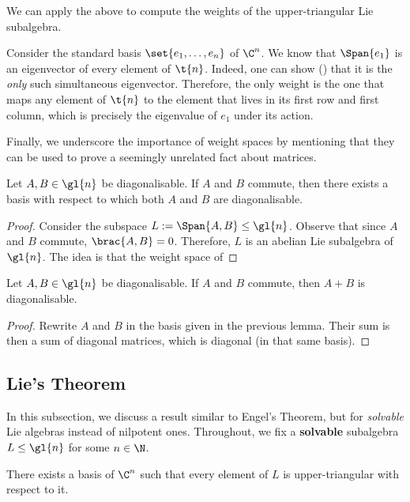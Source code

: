 We can apply the above to compute the weights of the upper-triangular Lie subalgebra.

\begin{boxexample}[$\t{n}$]
    Consider the standard basis $\set{e_1, \ldots, e_n}$ of $\C^n$. We know that $\Span{e_1}$ is an eigenvector of every element of $\t{n}$. Indeed, one can show (\sorry) that it is the \textit{only} such simultaneous eigenvector. Therefore, the only weight is the one that maps any element of $\t{n}$ to the element that lives in its first row and first column, which is precisely the eigenvalue of $e_1$ under its action. \sorry
\end{boxexample}

Finally, we underscore the importance of weight spaces by mentioning that they can be used to prove a seemingly unrelated fact about matrices.

\begin{lemma}\label{Ch1:Lemma:SimulDiagOfCommuting}
    Let $A, B \in \gl{n}$ be diagonalisable. If $A$ and $B$ commute, then there exists a basis with respect to which both $A$ and $B$ are diagonalisable.
\end{lemma}
\begin{proof}
    Consider the subspace $L := \Span{A, B} \leq \gl{n}$. Observe that since $A$ and $B$ commute, $\brac{A, B} = 0$. Therefore, $L$ is an abelian Lie subalgebra of $\gl{n}$. The idea is that the weight space of 
\end{proof}

\begin{corollary}
    Let $A, B \in \gl{n}$ be diagonalisable. If $A$ and $B$ commute, then $A + B$ is diagonalisable.
\end{corollary}
\begin{proof}
    Rewrite $A$ and $B$ in the basis given in the previous lemma. Their sum is then a sum of diagonal matrices, which is diagonal (in that same basis).
\end{proof}

\subsection{Lie's Theorem}

In this subsection, we discuss a result similar to Engel's Theorem, but for \textit{solvable} Lie algebras instead of nilpotent ones. Throughout, we fix a \textbf{solvable} subalgebra $L \leq \gl{n}$ for some $n \in \N$.

\begin{boxtheorem}\label{Ch1:Thm:Lie}
    There exists a basis of $\C^n$ such that every element of $L$ is upper-triangular with respect to it.
\end{boxtheorem}

